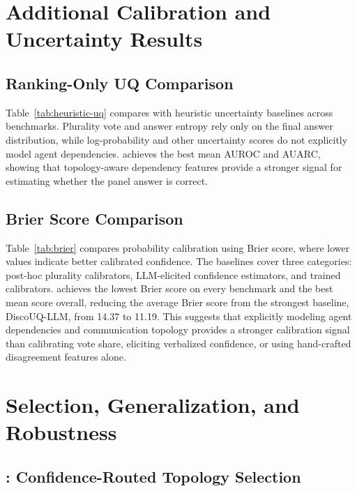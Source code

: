 \section{Additional Calibration and Uncertainty Results}
\label{app:additional_results}

\subsection{Ranking-Only UQ Comparison}
\label{con:Ranking-Only UQ Comparison}

Table~\ref{tab:heuristic-uq} compares \methodname{} with heuristic uncertainty baselines across benchmarks. 
Plurality vote and answer entropy rely only on the final answer distribution, while log-probability and other uncertainty scores do not explicitly model agent dependencies. 
\methodname{} achieves the best mean AUROC and AUARC, showing that topology-aware dependency features provide a stronger signal for estimating whether the panel answer is correct.

\subsection{Brier Score Comparison}
\label{con:brier_score}

Table~\ref{tab:brier} compares probability calibration using Brier score, where lower values indicate better calibrated confidence. 
The baselines cover three categories: post-hoc plurality calibrators, LLM-elicited confidence estimators, and trained calibrators. 
\methodname{} achieves the lowest Brier score on every benchmark and the best mean score overall, reducing the average Brier score from the strongest baseline, DiscoUQ-LLM, from 14.37 to 11.19. 
This suggests that explicitly modeling agent dependencies and communication topology provides a stronger calibration signal than calibrating vote share, eliciting verbalized confidence, or using hand-crafted disagreement features alone.

\section{Selection, Generalization, and Robustness}
\label{app:robustness}

\subsection{\select{}: Confidence-Routed Topology Selection}
\label{con:performance_cage_select}


